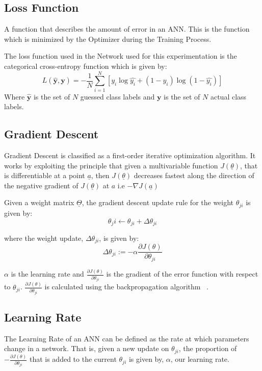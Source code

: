 \documentclass{article}
\begin{document}
\subsection{Loss Function}
A function that describes the amount of error in an ANN. This is the function which is minimized by the Optimizer during the Training Process.

The loss function used in the Network used for this experimentation is the categorical cross-entropy function which is given by:
\begin{equation}
L(\hat{\boldsymbol{y}},\boldsymbol{y}) = -\frac{1}{N}\sum_{i=1}^{N} [y_{i}\log{\hat{y_{i}}} + (1-y_{i})\log{(1 - \hat{y_{i}})}]
\end{equation}
Where $\hat{\boldsymbol{y}}$ is the set of $N$ guessed class labels and $\boldsymbol{y}$ is the set of $N$ actual class labels.
\subsection{Gradient Descent}
Gradient Descent is classified as a first-order iterative optimization algorithm. It works by exploiting the principle that given a multivariable function $J(\underline\theta)$, that is differentiable at a point $\underline{a}$, then $J(\underline\theta)$ decreases fastest along the direction of the negative gradient of $J(\underline\theta)$ at $a$ i.e $-\nabla{J(\underline{a})}$

Given a weight matrix $\underline\Theta$, the gradient descent update rule for the weight $\theta_{ji}$ is given by:
\begin{equation}
\theta_ji \leftarrow \theta_{ji} + \Delta\theta_{ji}
\end{equation}

where the weight update, $\Delta\theta_{ji}$, is given by:
\begin{equation}
\Delta\theta_{ji} := -\alpha\frac{\partial{J}(\theta)}{\partial{\theta_{ji}}}
\end{equation}


$\alpha$ is the learning rate and $\frac{\partial{J}(\theta)}{\partial{\theta_{ji}}}$ is the gradient of the error function with respect to $\theta_{ji}$.
$\frac{\partial{J}(\theta)}{\partial{\theta_{ji}}}$ is calculated using the backpropagation algorithm ~\cite{backpropagationOriginal}.


\subsection{Learning Rate}
The Learning Rate of an ANN can be defined as the rate at which parameters change in a network. That is, given a new update on $\theta_{ji}$, the proportion of $-\frac{\partial{J}(\theta)}{\partial{\theta_{ji}}}$ that is added to the current $\theta_{ji}$ is given by, $\alpha$, our learning rate.
\hfill\newline
\end{document}
